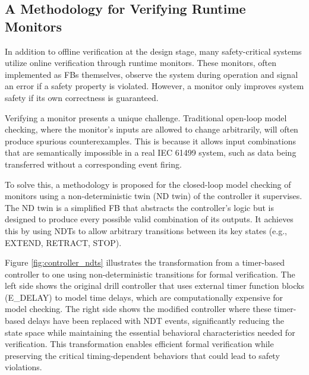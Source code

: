 \subsection{A Methodology for Verifying Runtime Monitors}

In addition to offline verification at the design stage, many safety-critical systems utilize online verification through runtime monitors. These monitors, often implemented as FBs themselves, observe the system during operation and signal an error if a safety property is violated. However, a monitor only improves system safety if its own correctness is guaranteed.

Verifying a monitor presents a unique challenge. Traditional open-loop model checking, where the monitor's inputs are allowed to change arbitrarily, will often produce spurious counterexamples. This is because it allows input combinations that are semantically impossible in a real IEC 61499 system, such as data being transferred without a corresponding event firing.

To solve this, a methodology is proposed for the closed-loop model checking of monitors using a non-deterministic twin (ND twin) of the controller it supervises. The ND twin is a simplified FB that abstracts the controller's logic but is designed to produce every possible valid combination of its outputs. It achieves this by using NDTs to allow arbitrary transitions between its key states (e.g., EXTEND, RETRACT, STOP).

Figure \ref{fig:controller_ndts} illustrates the transformation from a timer-based controller to one using non-deterministic transitions for formal verification. The left side shows the original drill controller that uses external timer function blocks (E\_DELAY) to model time delays, which are computationally expensive for model checking. The right side shows the modified controller where these timer-based delays have been replaced with NDT events, significantly reducing the state space while maintaining the essential behavioral characteristics needed for verification. This transformation enables efficient formal verification while preserving the critical timing-dependent behaviors that could lead to safety violations.

